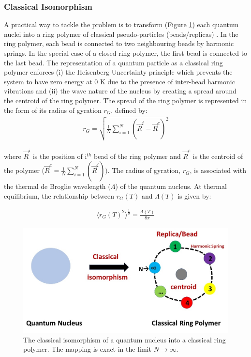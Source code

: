 \subsubsection*{Classical Isomorphism}
A practical way to tackle the problem is to transform (Figure \ref{fig:mapping}) each quantum nuclei into a ring polymer of classical pseudo-particles (beads/replicas) . In the ring polymer, each bead is connected to two neighbouring beads by harmonic springs. In the special case of a closed ring polymer, the first bead is connected to the last bead. The representation of a quantum particle as a classical ring polymer enforces (i) the Heisenberg Uncertainty principle which prevents the system to have zero energy at 0 K due to the presence of inter-bead harmonic vibrations and (ii) the wave nature of the nucleus by creating a spread around the centroid of the ring polymer. The spread of the ring polymer is represented in the form of its radius of gyration $r_G$, defined by:
\begin{align}
    \label{ROG-1}
     r_G = \sqrt{\frac{1}{N}\sum_{i=1}^{N} (\vec{R}^i-\vec{R}^c)^2}
\end{align}

\noindent where $\vec{R}^i$ is the position of i$^{th}$ bead of the ring polymer and $\vec{R}^c$ is the centroid of the polymer ($\vec{R}^c=\frac{1}{N}\sum_{i=1}^{N} (\vec{R}^i))$. The radius of gyration, $r_G$, is associated with the thermal de Broglie wavelength ($\Lambda$) of the quantum nucleus. At thermal equilibrium,  the relationship between $r_G(T)$ and $\Lambda(T)$ is given by:


\begin{align}
    \label{QPF-3}
    \langle r_G(T)^2\rangle^{\frac{1}{2}}=\frac{\Lambda(T)}{8\pi}
\end{align}

\begin{figure}
    \centering
    \includegraphics[width=12cm ]{./Comp_methods/Figures/mapping.jpg}
    \caption{The classical isomorphism of a quantum nucleus into a classical ring polymer. The mapping is exact in the limit ${N\to\infty}$.}
    \label{fig:mapping}
\end{figure}


